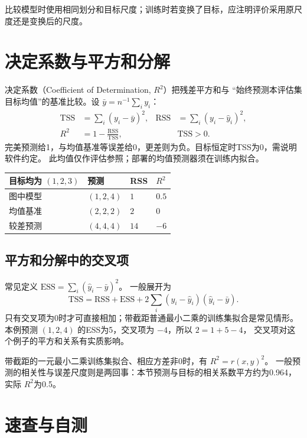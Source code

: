比较模型时使用相同划分和目标尺度；训练时若变换了目标，应注明评价采用原尺度还是变换后的尺度。

\section{决定系数与平方和分解}
\label{sec:eval-r2}

决定系数（Coefficient of Determination, $R^2$）把残差平方和与
“始终预测本评估集目标均值”的基准比较。设 $\bar y=n^{-1}\sum_i y_i$：
\begin{align}
 \mathrm{TSS}&=\sum_i(y_i-\bar y)^2, &
 \mathrm{RSS}&=\sum_i(y_i-\hat y_i)^2,\\
 R^2&=1-\frac{\mathrm{RSS}}{\mathrm{TSS}},\qquad & &\mathrm{TSS}>0.
 \label{eq:eval-r2}
\end{align}
完美预测给1，与均值基准等误差给0，更差则为负。目标恒定时TSS为0，需说明软件约定。
此均值仅作评估参照；部署的均值预测器须在训练内拟合。

\begin{center}
\small
\begin{tabularx}{\textwidth}{P{29mm}Y Y Y}
\toprule
目标均为 $(1,2,3)$ & 预测 & RSS & $R^2$\\
\midrule
图中模型 & $(1,2,4)$ & $1$ & $0.5$\\
均值基准 & $(2,2,2)$ & $2$ & $0$\\
较差预测 & $(4,4,4)$ & $14$ & $-6$\\
\bottomrule
\end{tabularx}
\end{center}

\subsection{平方和分解中的交叉项}
常见定义 $\mathrm{ESS}=\sum_i(\hat y_i-\bar y)^2$。
一般展开为
\[
 \mathrm{TSS}=\mathrm{RSS}+\mathrm{ESS}
   +2\sum_i(y_i-\hat y_i)(\hat y_i-\bar y).
\]
只有交叉项为0时才可直接相加；带截距普通最小二乘的训练集拟合是常见情形。
本例预测 $(1,2,4)$ 的ESS为5，交叉项为 $-4$，所以 $2=1+5-4$，
交叉项对这个例子的平方和关系有实质影响。

\begin{pitfall}[$R^2$与相关系数平方]
带截距的一元最小二乘训练集拟合、相应方差非0时，有 $R^2=r(x,y)^2$。
一般预测的相关性与误差尺度则是两回事：本节预测与目标的相关系数平方约为0.964，
实际 $R^2$为0.5。
\end{pitfall}

\section{速查与自测}
\label{sec:eval-summary}

